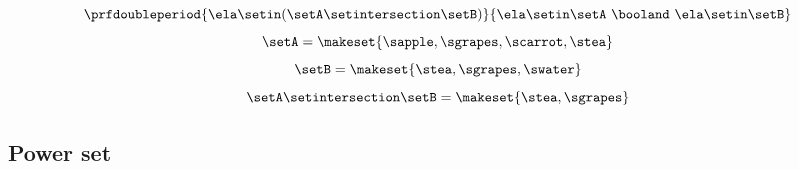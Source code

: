 {\begin{forslides}
        \begin{equation}
            \label{eq:slides_session2_12}
            \prfdoubleperiod{ \ela \setin(\setA \setintersection \setB)}{\ela \setin\setA \ \booland\ \ela \setin\setB}
        \end{equation}
        \begin{equation}
            \label{eq:slides_session2_13}
            \setA = \makeset{ \sapple, \sgrapes, \scarrot, \stea }
        \end{equation}
        \begin{equation}
            \label{eq:slides_session2_14}
            \setB = \makeset{ \stea, \sgrapes, \swater }
        \end{equation}
        \begin{equation}
            \label{eq:slides_session2_15}
            \setA \setintersection \setB = \makeset{ \stea, \sgrapes }
        \end{equation}

        \subsection{Power set}


\end{forslides}}
